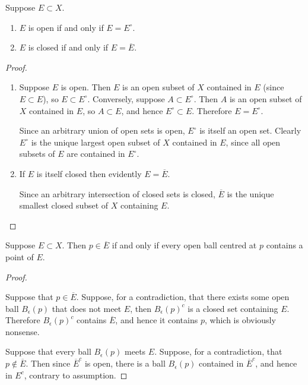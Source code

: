 \begin{proposition}
Suppose $E\subset X$.
\begin{enumerate}[label=(\roman*)]
\item $E$ is open if and only if $E=E^\circ$.
\item $E$ is closed if and only if $E=\overline{E}$.
\end{enumerate}

\end{proposition}

\begin{proof} \
\begin{enumerate}[label=(\roman*)]
\item \fbox{$\implies$} Suppose $E$ is open. Then $E$ is an open subset of $X$ contained in $E$ (since $E\subset E$), so $E\subset E^\circ$. Conversely, suppose $A\subset E^\circ$. Then $A$ is an open subset of $X$ contained in $E$, so $A\subset E$, and hence $E^\circ\subset E$. Therefore $E=E^\circ$.

\fbox{$\impliedby$} Since an arbitrary union of open sets is open, $E^\circ$ is itself an open set. Clearly $E^\circ$ is the unique largest open subset of $X$ contained in $E$, since all open subsets of $E$ are contained in $E^\circ$.

\item \fbox{$\implies$} If $E$ is itself closed then evidently $E=\overline{E}$.

\fbox{$\impliedby$} Since an arbitrary intersection of closed sets is closed, $\overline{E}$ is the unique smallest closed subset of $X$ containing $E$. 
\end{enumerate}
\end{proof}

\begin{proposition}
Suppose $E\subset X$. Then $p\in\overline{E}$ if and only if every open ball centred at $p$ contains a point of $E$.
\end{proposition}

\begin{proof} \

\fbox{$\implies$} Suppose that $p\in\overline{E}$. Suppose, for a contradiction, that there exists some open ball $B_\epsilon(p)$ that does not meet $E$, then $B_\epsilon(p)^c$ is a closed set containing $E$. Therefore $B_\epsilon(p)^c$ contains $\overline{E}$, and hence it contains $p$, which is obviously nonsense.

\fbox{$\impliedby$} Suppose that every ball $B_\epsilon(p)$ meets $E$. Suppose, for a contradiction, that $p\notin\overline{E}$. Then since $\overline{E}^c$ is open, there is a ball $B_\epsilon(p)$ contained in $\overline{E}^c$, and hence in $E^c$, contrary to assumption.
\end{proof}

